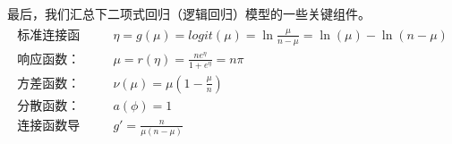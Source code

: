\documentclass[letterpaper,10pt,english]{sphinxmanual}
\begin{document}
最后，我们汇总下二项式回归（逻辑回归）模型的一些关键组件。
\begin{align}\label{equation:二项模型/content:二项模型/content:32}\!\begin{aligned}
\text{标准连接函数：}  & \eta = g(\mu) =  logit(\mu) = \ln  \frac{\mu}{n-\mu} = \ln(\mu) - \ln(n-\mu)\\
\text{响应函数：}  & \mu = r(\eta) = \frac{n e^{\eta}}{1+e^{\eta}} = n \pi\\
\text{方差函数：}  & \nu(\mu) = \mu(1-\frac{\mu}{n})\\
\text{分散函数：}  & a(\phi) = 1\\
\text{连接函数导数：} & g'= \frac{n}{\mu(n-\mu)}\\
\end{aligned}\end{align}
\end{document}
